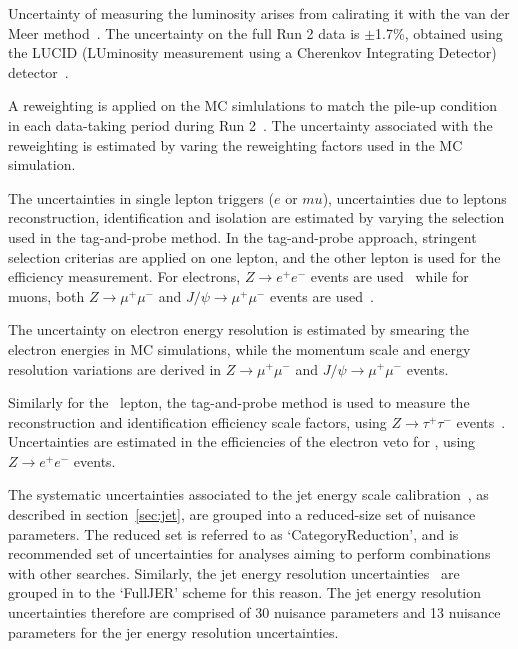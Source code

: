 Uncertainty of measuring the luminosity 
arises from calirating it with the van der Meer method~\cite{DAPR-2013-01}.
The uncertainty on the full Run 2 data is $\pm$1.7\%, obtained using the
LUCID (LUminosity measurement using a Cherenkov Integrating Detector)
detector~\cite{ATLAS-Lumi2}.

A reweighting is applied on the MC simlulations to match 
the pile-up condition in each data-taking period during Run 2~\cite{STDM-2015-05}. 
The uncertainty associated with the reweighting
is estimated by varing the reweighting factors used in the MC simulation. 

The uncertainties in single lepton triggers ($e$ or $mu$), 
uncertainties due to leptons reconstruction, identification and
isolation are estimated by varying the selection used in the
tag-and-probe method. 
In the tag-and-probe approach, stringent selection criterias are applied on one lepton,
and the other lepton is used for the efficiency measurement. 
For electrons, $Z\rightarrow e^+e^-$ events 
are used~\cite{EGAM-2018-01} while for muons, 
both $Z\rightarrow \mu^+\mu^-$  and $J/\psi\rightarrow \mu^+\mu^-$ events
are used~\cite{CERN-EP-2020-199}. 


The uncertainty on electron energy resolution is estimated by smearing the
electron energies in MC simulations, while 
the momentum scale and energy resolution variations are derived in 
$Z\rightarrow \mu^+\mu^-$  and $J/\psi\rightarrow \mu^+\mu^-$ events. 

Similarly for the \tauhad\ lepton, the tag-and-probe method is used
to measure the reconstruction and identification efficiency scale factors,
using $Z\rightarrow \tau^+\tau^-$ events~\cite{ATLAS-CONF-2017-029}.  
Uncertainties are estimated in the efficiencies of the electron veto for
\tauhad, using $Z\rightarrow e^+e^-$ events. 


The systematic uncertainties associated to the jet energy scale
calibration~\cite{JETM-2018-05}, 
as described in section~\ref{sec:jet}, are grouped into
a reduced-size set of nuisance parameters.
The reduced set is referred to as `CategoryReduction', 
and is recommended set of uncertainties for analyses
aiming to perform combinations with other searches. 
Similarly, the jet energy resolution uncertainties~\cite{JETM-2018-05}
are grouped in to the `FullJER' scheme for this reason.
The jet energy resolution uncertainties therefore are 
comprised of 30 nuisance parameters 
and 13 nuisance parameters for the jer energy resolution uncertainties. 


